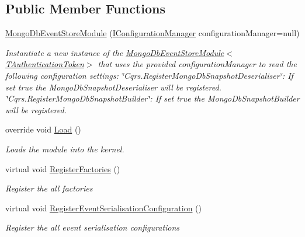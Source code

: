 \subsection*{Public Member Functions}
\begin{DoxyCompactItemize}
\item 
\hyperlink{classCqrs_1_1Ninject_1_1MongoDB_1_1Configuration_1_1MongoDbEventStoreModule_ad412eadf4ac7d4ddfe1edc6559127edd_ad412eadf4ac7d4ddfe1edc6559127edd}{Mongo\+Db\+Event\+Store\+Module} (\hyperlink{interfaceCqrs_1_1Configuration_1_1IConfigurationManager}{I\+Configuration\+Manager} configuration\+Manager=null)
\begin{DoxyCompactList}\small\item\em Instantiate a new instance of the \hyperlink{classCqrs_1_1Ninject_1_1MongoDB_1_1Configuration_1_1MongoDbEventStoreModule_ad412eadf4ac7d4ddfe1edc6559127edd_ad412eadf4ac7d4ddfe1edc6559127edd}{Mongo\+Db\+Event\+Store\+Module$<$\+T\+Authentication\+Token$>$} that uses the provided {\itshape configuration\+Manager}  to read the following configuration settings\+: \char`\"{}\+Cqrs.\+Register\+Mongo\+Db\+Snapshot\+Deserialiser\char`\"{}\+: If set true the Mongo\+Db\+Snapshot\+Deserialiser will be registered. \char`\"{}\+Cqrs.\+Register\+Mongo\+Db\+Snapshot\+Builder\char`\"{}\+: If set true the Mongo\+Db\+Snapshot\+Builder will be registered. \end{DoxyCompactList}\item 
override void \hyperlink{classCqrs_1_1Ninject_1_1MongoDB_1_1Configuration_1_1MongoDbEventStoreModule_aafdbd906511857f65cbd0789d458be18_aafdbd906511857f65cbd0789d458be18}{Load} ()
\begin{DoxyCompactList}\small\item\em Loads the module into the kernel. \end{DoxyCompactList}\item 
virtual void \hyperlink{classCqrs_1_1Ninject_1_1MongoDB_1_1Configuration_1_1MongoDbEventStoreModule_a32cbf7060777484eb68c4dc032109e6c_a32cbf7060777484eb68c4dc032109e6c}{Register\+Factories} ()
\begin{DoxyCompactList}\small\item\em Register the all factories \end{DoxyCompactList}\item 
virtual void \hyperlink{classCqrs_1_1Ninject_1_1MongoDB_1_1Configuration_1_1MongoDbEventStoreModule_a34736afbd831dd3cd1ec04708a5a519e_a34736afbd831dd3cd1ec04708a5a519e}{Register\+Event\+Serialisation\+Configuration} ()
\begin{DoxyCompactList}\small\item\em Register the all event serialisation configurations \end{DoxyCompactList}\item 

\end{DoxyCompactItemize}
